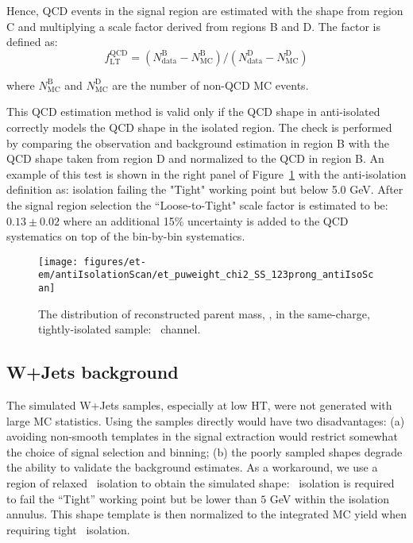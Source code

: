 Hence, QCD events in the signal region are estimated with the shape from region C 
and multiplying a scale factor derived from regions B and D. The factor is defined as:
\begin{equation}\label{eq:et_qcd_sf}
f_\mathrm{LT}^\mathrm{QCD} = \left(N_\mathrm{data}^\mathrm{B} - N_\mathrm{MC}^\mathrm{B}\right)
/ \left(N_\mathrm{data}^\mathrm{D} -
N_\mathrm{MC}^\mathrm{D}\right)
\end{equation}

\noindent where $N_\mathrm{MC}^\mathrm{B}$ and $N_\mathrm{MC}^\mathrm{D}$ are the number of non-QCD MC events.

This QCD estimation method is valid only if the QCD shape in
anti-isolated correctly models the QCD shape in the isolated
region. The check is performed by comparing the observation and background
estimation in region B with the QCD shape taken from region D and
normalized to the QCD in region B.  An example of this test is shown
in the right panel of Figure~\ref{fig:et_sst} with the anti-isolation
definition as: \tauh isolation failing the "Tight" working point but
below 5.0 GeV. After the signal region selection the ``Loose-to-Tight" scale factor is estimated
to be: $0.13 \pm 0.02$ where an additional 15\% uncertainty is added to the QCD systematics 
on top of the bin-by-bin systematics.

\begin{figure}[thbp!]\centering
  \texttt{[image: figures/et-em/antiIsolationScan/et\_puweight\_chi2\_SS\_123prong\_antiIsoScan]} %
  \caption{\label{fig:et_sst} The distribution of reconstructed parent
    mass, \meffetau, in the same-charge, tightly-isolated sample:
    \teth ~channel.}
\end{figure}

\subsection{W+Jets background}
\label{sec:et_w_bkg_validation}

The simulated W+Jets samples, especially at low HT, were not
generated with large MC statistics.  Using the samples directly would
have two disadvantages: (a) avoiding non-smooth templates in the
signal extraction would restrict somewhat the choice of signal
selection and binning; (b) the poorly sampled shapes degrade the
ability to validate the background estimates.  As a workaround, we use
a region of relaxed \tauh ~isolation to obtain the simulated shape:
\tauh ~isolation is required to fail the ``Tight'' working point but be
lower than $5$ GeV within the isolation annulus.  This shape template is then normalized to the
integrated MC yield when requiring tight \tauh ~isolation.

